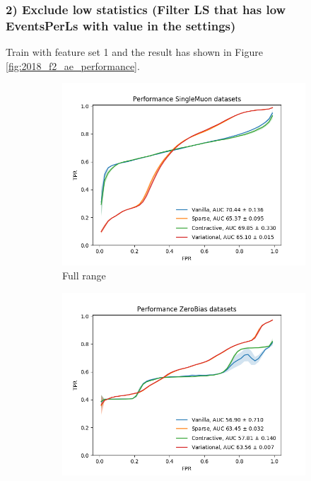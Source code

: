 \subsubsection{2) Exclude low statistics (Filter LS that has low EventsPerLs with value in the settings)}
Train with feature set 1 and the result has shown in Figure \ref{fig:2018_f2_ae_performance}.


\begin{figure}[h!]
\centering
    \begin{subfigure}[b]{0.49\linewidth}
        \includegraphics[width=\linewidth]{images/reco/2018/feature_2/performance_SingleMuon_VanillaSparseContractiveVariational.png}
        \caption{Full range}
    \end{subfigure}
    \begin{subfigure}[b]{0.49\linewidth}
        \includegraphics[width=\linewidth]{images/reco/2018/feature_2/performance_ZeroBias_VanillaSparseContractiveVariational.png}

\end{subfigure}
\end{figure}
